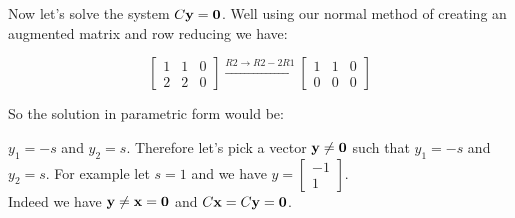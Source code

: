 \documentclass[12pt]{article}
\begin{document}
\noindent Now let's solve the system $C{\bf y} = {\bf 0}$.  Well using our normal method of creating an augmented matrix and row reducing we have:

\[ \left[ 
\begin{array}{cc|c} 1 &1 & 0 \\ 2 & 2 & 0 \end{array} \right] 
\xrightarrow[]{R2\rightarrow R2-2R1} 
\left[  \begin{array}{cc|c} 1 &1 & 0 \\ 0 & 0 & 0 \end{array} \right] \]

S\noindent o the solution in parametric form would be:

\noindent $y_1 = -s$ and $y_2 = s$.  Therefore let's pick a vector ${\bf y}\neq {\bf 0}$ such that $y_1 = -s$ and $y_2 = s$.  For example let $s=1$ and we have $y=\left[ \begin{array}{c} -1  \\ 1 \end{array} \right]$.\\

\noindent Indeed we have ${\bf y}\neq {\bf x} = {\bf 0}$ and $C {\bf x} = C{\bf y} = {\bf 0}$.









\end{document}
